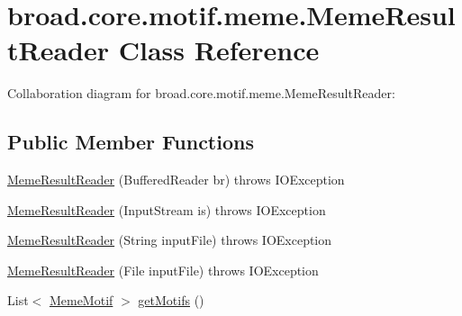 \hypertarget{classbroad_1_1core_1_1motif_1_1meme_1_1_meme_result_reader}{\section{broad.\+core.\+motif.\+meme.\+Meme\+Result\+Reader Class Reference}
\label{classbroad_1_1core_1_1motif_1_1meme_1_1_meme_result_reader}
}


Collaboration diagram for broad.\+core.\+motif.\+meme.\+Meme\+Result\+Reader\+:
\subsection*{Public Member Functions}
\begin{DoxyCompactItemize}
\item 
\hyperlink{classbroad_1_1core_1_1motif_1_1meme_1_1_meme_result_reader_a929af183e500736fc2a8ea2bc8aa09be}{Meme\+Result\+Reader} (Buffered\+Reader br)  throws I\+O\+Exception 
\item 
\hyperlink{classbroad_1_1core_1_1motif_1_1meme_1_1_meme_result_reader_a2e677234552ec870fe41d04c28cfea62}{Meme\+Result\+Reader} (Input\+Stream is)  throws I\+O\+Exception 
\item 
\hyperlink{classbroad_1_1core_1_1motif_1_1meme_1_1_meme_result_reader_ae93f6a93c232489c697ee331676ce32b}{Meme\+Result\+Reader} (String input\+File)  throws I\+O\+Exception 
\item 
\hyperlink{classbroad_1_1core_1_1motif_1_1meme_1_1_meme_result_reader_ae99873159732c5ef66a305ca563f24d1}{Meme\+Result\+Reader} (File input\+File)  throws I\+O\+Exception 
\item 
List$<$ \hyperlink{classbroad_1_1core_1_1motif_1_1meme_1_1_meme_motif}{Meme\+Motif} $>$ \hyperlink{classbroad_1_1core_1_1motif_1_1meme_1_1_meme_result_reader_ac9c8a40eab0c87a4c28f78e92d88e8d9}{get\+Motifs} ()
\end{DoxyCompactItemize}


